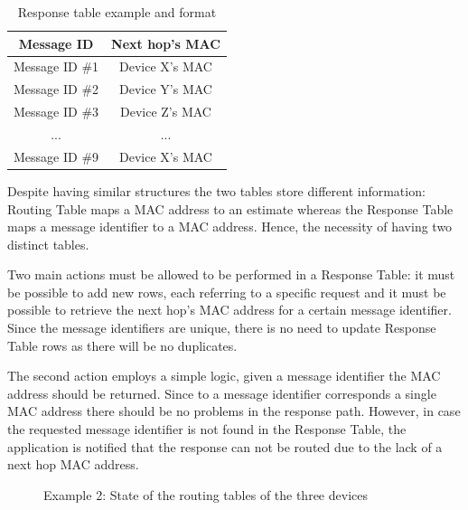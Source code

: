 \begin{table}[ht]
\centering
\bgroup
\def\arraystretch{2.5}
\begin{tabular}{|c|c|}
\hline
\textbf{Message ID} & \textbf{Next hop's MAC} \\ \hline
Message ID \#1 & Device X's MAC \\ \hline
Message ID \#2 & Device Y's MAC \\ \hline
Message ID \#3 & Device Z's MAC \\ \hline
... & ... \\ \hline
Message ID \#9 & Device X's MAC \\ \hline
\end{tabular}
\egroup
\caption{Response table example and format}
\label{tab:rspTables}
\end{table}

Despite having similar structures the two tables store different information: Routing Table maps a \gls{MAC} address to an estimate whereas the Response Table maps a message identifier to a \gls{MAC} address. Hence, the necessity of having two distinct tables.

Two main actions must be allowed to be performed in a Response Table: it must be possible to add new rows, each referring to a specific request and it must be possible to retrieve the next hop's \gls{MAC} address for a certain message identifier. Since the message identifiers are unique, there is no need to update Response Table rows as there will be no duplicates.

The second action employs a simple logic, given a message identifier the \gls{MAC} address should be returned. Since to a message identifier corresponds a single \gls{MAC} address there should be no problems in the response path. However, in case the requested message identifier is not found in the Response Table, the application is notified that the response can not be routed due to the lack of a next hop \gls{MAC} address.


\begin{figure}[ht]
   \noindent{}
	\caption{\label{fig:example1.0} Example 2: State of the routing tables of the three devices}
\end{figure}

